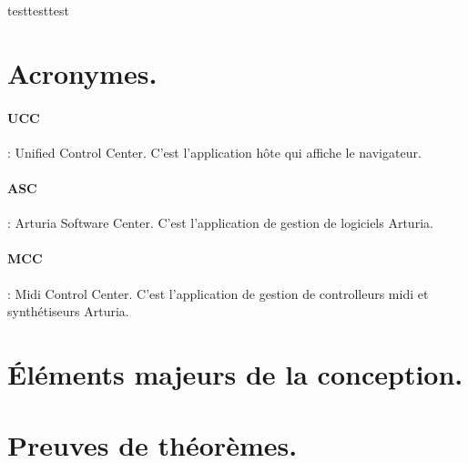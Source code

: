 \documentclass[francais]{rapportPFE}  %
\begin{document}
 
 





testtesttest


\appendix
\section{Acronymes.}
\paragraph{UCC}: Unified Control Center. C'est l'application hôte qui affiche le navigateur.
\paragraph{ASC}: Arturia Software Center. C'est l'application de gestion de logiciels Arturia.
\paragraph{MCC}: Midi Control Center. C'est l'application de gestion de controlleurs midi et synthétiseurs Arturia.

\section{Éléments majeurs de la conception.}

\section{Preuves de théorèmes.}
\end{document}
